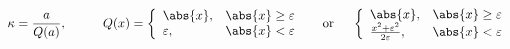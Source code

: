 \documentclass[]{article}
\begin{document}
\begin{equation*}
  \kappa =\frac{a}{Q(a)},\hspace{1cm}Q(x) = \left\{\begin{array}{ll} \abs{x}, & \abs{x}\ge \varepsilon \\
  \varepsilon, & \abs{x} < \varepsilon \\
  \end{array}\right.\hspace{5mm}\mbox{or}\hspace{5mm}
  \left\{\begin{array}{ll} \abs{x}, & \abs{x}\ge \varepsilon \\
  \frac{x^2+\varepsilon^2}{2\varepsilon}, & \abs{x} < \varepsilon \\ \end{array}\right.
\end{equation*}
\end{document}
